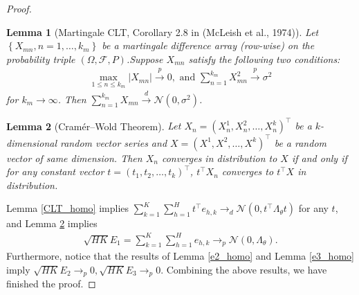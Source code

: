 \documentclass{article}
\newtheorem{lemma}{Lemma}[section]
\numberwithin{equation}{section}
\begin{document}
\begin{proof}
\begin{lemma}[Martingale CLT, Corollary 2.8 in (McLeish et al., 1974)]
Let $\left\{X_{mn},n=1,\ldots,k_m\right\}$ be a martingale difference array (row-wise) on the probability triple $(\Omega, \mathcal{F}, P)$.Suppose $X_{mn}$ satisfy the following two conditions:
\begin{align*}
    \max _{1\leq n\leq k_m}\left\vert X_{mn}\right\vert\stackrel{p}{\rightarrow}0,\textrm{ and } \sum_{n=1}^{k_m}X_{mn}^2\stackrel{p}{\rightarrow}\sigma^2
\end{align*}
for $k_m\rightarrow\infty$. Then $\sum_{n=1}^{k_m}X_{mn}\stackrel{d}{\rightarrow}\mathcal{N}\left(0,\sigma^2\right)$.
\end{lemma}
\begin{lemma}[Cramér–Wold Theorem] 
\label{CW_thm_homo}
Let $X_n=(X_n^1,X_n^2,\ldots,X_n^k)^\top$ be a $k$-dimensional random vector series and $X=(X^1,X^2,\ldots,X^k)^\top$ be a random vector of same dimension. Then $X_n$ converges in distribution to $X$ if and only if for any constant vector $t=(t_1,t_2,\ldots,t_k)^\top$, $t^\top X_n$ converges to $t^\top X$ in distribution.
\end{lemma}
Lemma \ref{CLT_homo} implies $\sum_{k=1}^K\sum_{h=1}^H t^\top e_{h,k}\rightarrow_d\mathcal{N}(0,t^\top\Lambda_\theta t)$ for any $t$, and Lemma \ref{CW_thm_homo} implies
\begin{align*}
    \sqrt{HK}E_1=\sum_{k=1}^K\sum_{h=1}^H e_{h,k}\rightarrow_p\mathcal{N}(0,\Lambda_\theta). 
\end{align*}
Furthermore, notice that the results of Lemma \ref{e2_homo} and Lemma \ref{e3_homo} imply $\sqrt{HK}E_2\rightarrow_p 0, \sqrt{HK}E_3\rightarrow_p 0$. Combining the above results, we have finished the proof. 
\end{proof}
\end{document}
